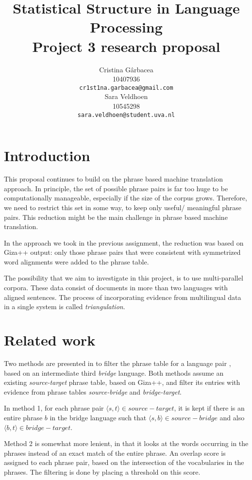 \documentclass[11pt]{article}
\title{Statistical Structure in Language Processing \\Project 3 research proposal}
\author{ Cristina G\^arbacea\\
  10407936 \\
  {\small \tt cr1st1na.garbacea@gmail.com} 
  \\\And
  Sara Veldhoen \\
10545298   \\
  {\small \tt sara.veldhoen@student.uva.nl} \\}
\date{}
\begin{document}
\maketitle


\section{Introduction}
This proposal continues to build on the phrase based machine translation approach.
In principle, the set of possible phrase pairs is far too huge to be computationally manageable, especially if the size of the corpus grows.
Therefore, we need to restrict this set in some way, to keep only useful/ meaningful phrase pairs. This reduction might be the main challenge in phrase based machine translation.

In the approach we took in the previous assignment, the reduction was based on Giza++ output: only those phrase pairs that were consistent with symmetrized word alignments were added to the phrase table.

The possibility that we aim to investigate in this project, is to use multi-parallel corpora. These data consist of documents in more than two languages with aligned sentences. The process of incorporating evidence from multilingual data in a single system is called \emph{triangulation}. 

\section{Related work}

Two methods are presented in \cite{chen} to filter the phrase table for a language pair%
, based on an intermediate third \emph{bridge} language. 
 Both methods assume an existing {\em source-target} phrase table, based on Giza++, and filter its entries with evidence from phrase tables {\em source-bridge} and {\em bridge-target}.

In method 1, for each phrase pair $\langle s, t\rangle \in source-target$, it is kept if there is an entire phrase $b$ in the bridge language such that $\langle s,b\rangle \in source-bridge$ and also $\langle b,t\rangle \in bridge-target$.

Method 2 is somewhat more lenient, in that it looks at the words occurring in the phrases instead of an exact match of the entire phrase. An overlap score is assigned to each phrase pair, based on the intersection of the vocabularies in the phrases. The filtering is done by placing a threshold on this score.
\end{document}
